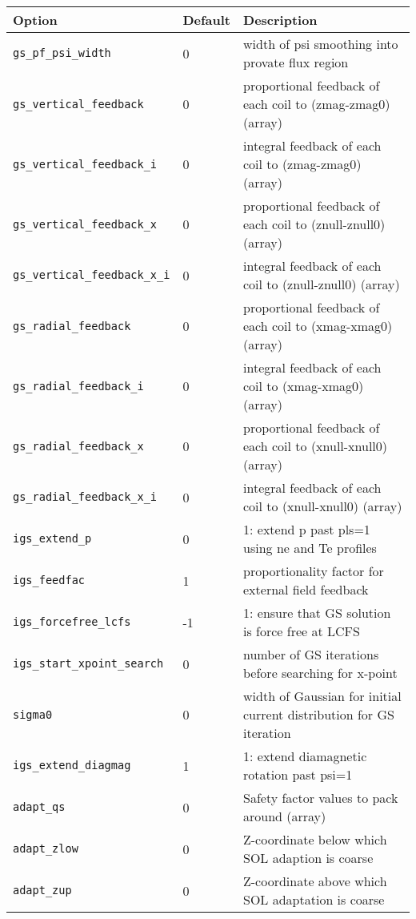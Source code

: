   \begin{tabular}{llp{4.0in}}
  \textbf{Option}&\textbf{Default}&\textbf{Description}\\
  \hline
 \texttt{gs\_pf\_psi\_width}            & 0 & width of psi smoothing into provate flux region \\
 \texttt{gs\_vertical\_feedback}        & 0 & proportional feedback of each coil to (zmag-zmag0) (array) \\ 
 \texttt{gs\_vertical\_feedback\_i}     & 0 & integral feedback of each coil to (zmag-zmag0) (array) \\
 \texttt{gs\_vertical\_feedback\_x}     & 0 & proportional feedback of each coil to (znull-znull0) (array) \\
 \texttt{gs\_vertical\_feedback\_x\_i} & 0 & integral feedback of each coil to (znull-znull0) (array) \\
 \texttt{gs\_radial\_feedback}          & 0 & proportional feedback of each coil to (xmag-xmag0) (array) \\
 \texttt{gs\_radial\_feedback\_i}       & 0 & integral feedback of each coil to (xmag-xmag0) (array) \\
 \texttt{gs\_radial\_feedback\_x}       & 0 & proportional feedback of each coil to (xnull-xnull0) (array) \\
 \texttt{gs\_radial\_feedback\_x\_i}    & 0 & integral feedback of each coil to (xnull-xnull0) (array) \\
 \texttt{igs\_extend\_p}                & 0 & 1: extend p past pls=1 using ne and Te profiles  \\
 \texttt{igs\_feedfac}                  & 1 & proportionality factor for external field feedback \\
 \texttt{igs\_forcefree\_lcfs}          & -1 & 1: ensure that GS solution is force free at LCFS \\
 \texttt{igs\_start\_xpoint\_search}    & 0 &  number of GS iterations before searching for x-point \\
 \texttt{sigma0}                        & 0 &  width of Gaussian for initial current distribution for GS iteration \\
 \texttt{igs\_extend\_diagmag}          & 1 &  1: extend diamagnetic rotation past psi=1 \\
 
\texttt{adapt\_qs} & 0 & Safety factor values to pack around (array) \\
\texttt{adapt\_zlow} & 0 & Z-coordinate below which SOL adaption is coarse \\
\texttt{adapt\_zup}  & 0 & Z-coordinate above which SOL adaptation is coarse


\end{tabular}




